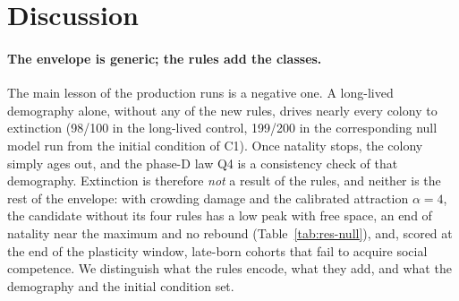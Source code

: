 \section{Discussion}
\label{sec:discussion}

\paragraph{The envelope is generic; the rules add the classes.}
The main lesson of the production runs is a negative one.
A long-lived demography alone, without any of the new rules, drives nearly every colony to extinction (98/100 in the long-lived control, 199/200 in the corresponding null model run from the initial condition of \textsf{C1}).
Once natality stops, the colony simply ages out, and the phase-D law Q4 is a consistency check of that demography.
Extinction is therefore \emph{not} a result of the rules, and neither is the rest of the envelope: with crowding
damage and the calibrated attraction $\alpha=4$, the candidate without its four rules has a low peak with free space,
an end of natality near the maximum and no rebound (Table~\ref{tab:res-null}), and, scored at the end of the
plasticity window, late-born cohorts that fail to acquire social competence.
We distinguish what the rules encode, what they add, and what the demography and the initial condition set.

